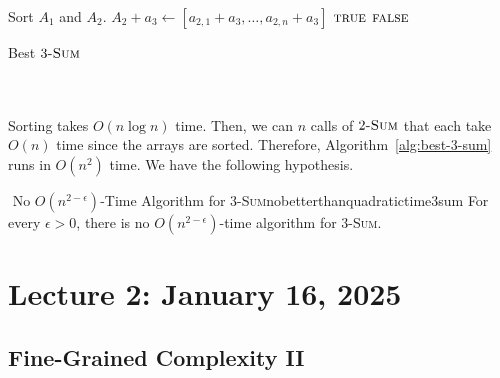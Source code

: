         \begin{algorithm}[H] 
            \begin{algorithmic}[1]
                    \State Sort \(A_1\) and \(A_2\).
                        \State \(A_2+a_3\gets [a_{2,1}+a_3,\ldots,a_{2,n}+a_3]\) 
                         \Return \(\textsc{true}\)
                        \EndIf
                    \EndFor
                    \State \Return \(\textsc{false}\)
                \EndProcedure 
            \end{algorithmic}
            \caption{Best \(3\textsc{-Sum}\)}
            \label{alg:best-3-sum}
        \end{algorithm}
        \vphantom
        \\
        \\
        Sorting takes \(O(n\log n)\) time. Then, we can \(n\) calls of \(2\textsc{-Sum}\) that each take \(O(n)\) time since the arrays are sorted. Therefore, Algorithm~\ref{alg:best-3-sum} runs in \(O(n^2)\) time. We have the following hypothesis.
        \begin{hypothesis}{\Stop\,\,No \(O(n^{2-\epsilon})\)-Time Algorithm for \(3\)-\textsc{Sum}}{nobetterthanquadratictime3sum}
            For every \(\epsilon>0\), there is no \(O\left(n^{2-\epsilon}\right)\)-time algorithm for \(3\)-\textsc{Sum}.
        \end{hypothesis}
        

\pagebreak

\section{Lecture 2: January 16, 2025}

    \subsection{Fine-Grained Complexity II}

